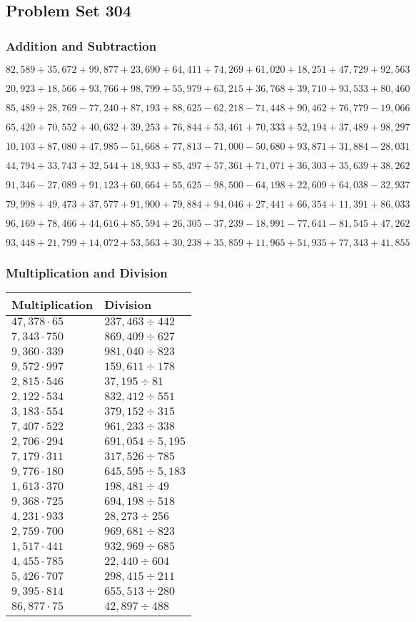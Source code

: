 \hypertarget{problem-set-304}{%
\subsection{Problem Set 304}\label{problem-set-304}}

\hypertarget{addition-and-subtraction}{%
\subsubsection{Addition and
Subtraction}\label{addition-and-subtraction}}

\(82,589+35,672+99,877+23,690+64,411+74,269+61,020+18,251+47,729+92,563\)

\(20,923+18,566+93,766+98,799+55,979+63,215+36,768+39,710+93,533+80,460\)

\(85,489+28,769-77,240+87,193+88,625-62,218-71,448+90,462+76,779-19,066\)

\(65,420+70,552+40,632+39,253+76,844+53,461+70,333+52,194+37,489+98,297\)

\(10,103+87,080+47,985-51,668+77,813-71,000-50,680+93,871+31,884-28,031\)

\(44,794+33,743+32,544+18,933+85,497+57,361+71,071+36,303+35,639+38,262\)

\(91,346-27,089+91,123+60,664+55,625-98,500-64,198+22,609+64,038-32,937\)

\(79,998+49,473+37,577+91,900+79,884+94,046+27,441+66,354+11,391+86,033\)

\(96,169+78,466+44,616+85,594+26,305-37,239-18,991-77,641-81,545+47,262\)

\(93,448+21,799+14,072+53,563+30,238+35,859+11,965+51,935+77,343+41,855\)

\hypertarget{multiplication-and-division}{%
\subsubsection{Multiplication and
Division}\label{multiplication-and-division}}

\begin{longtable}[]{@{}ll@{}}
\toprule
Multiplication & Division\tabularnewline
\midrule
\endhead
\(47,378\cdot65\) & \(237,463÷442\)\tabularnewline
\(7,343\cdot750\) & \(869,409÷627\)\tabularnewline
\(9,360\cdot339\) & \(981,040÷823\)\tabularnewline
\(9,572\cdot997\) & \(159,611÷178\)\tabularnewline
\(2,815\cdot546\) & \(37,195÷81\)\tabularnewline
\(2,122\cdot534\) & \(832,412÷551\)\tabularnewline
\(3,183\cdot554\) & \(379,152÷315\)\tabularnewline
\(7,407\cdot522\) & \(961,233÷338\)\tabularnewline
\(2,706\cdot294\) & \(691,054÷5,195\)\tabularnewline
\(7,179\cdot311\) & \(317,526÷785\)\tabularnewline
\(9,776\cdot180\) & \(645,595÷5,183\)\tabularnewline
\(1,613\cdot370\) & \(198,481÷49\)\tabularnewline
\(9,368\cdot725\) & \(694,198÷518\)\tabularnewline
\(4,231\cdot933\) & \(28,273÷256\)\tabularnewline
\(2,759\cdot700\) & \(969,681÷823\)\tabularnewline
\(1,517\cdot441\) & \(932,969÷685\)\tabularnewline
\(4,455\cdot785\) & \(22,440÷604\)\tabularnewline
\(5,426\cdot707\) & \(298,415÷211\)\tabularnewline
\(9,395\cdot814\) & \(655,513÷280\)\tabularnewline
\(86,877\cdot75\) & \(42,897÷488\)\tabularnewline
\bottomrule
\end{longtable}
